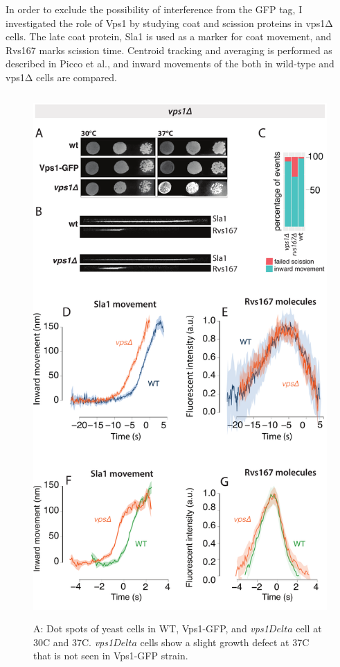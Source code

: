 	\vspace{5mm}
	In order to exclude the possibility of interference from the GFP tag, I investigated the role of Vps1 by studying coat and scission proteins in vps1Δ cells. The late coat protein, Sla1 is used as a marker for coat movement, and Rvs167 marks scission time. Centroid tracking and averaging is performed as described in Picco et al., and inward movements of the both in wild-type and vps1Δ cells are compared. 

	\begin{figure}
	\centering
	\includegraphics[width=20cm,height=20cm,keepaspectratio]{figures/results_final/vps}
	\caption[Rvs localization in vps deletion]
	{A: Dot spots of yeast cells in WT, Vps1-GFP, and \textit{vps1$Delta$} cell at 30C and 37C. \textit{vps1$Delta$} cells show a slight growth defect at 37C that is not seen in Vps1-GFP strain. 
}
\end{figure}
